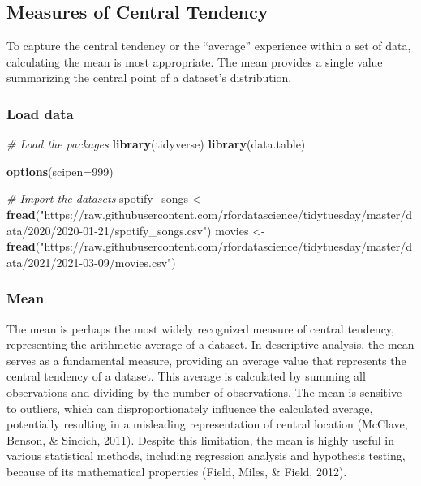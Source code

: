 \documentclass[
]{book}
\newenvironment{Shaded}{\begin{snugshade}}{\end{snugshade}}
\newcommand{\AttributeTok}[1]{\textcolor[rgb]{0.13,0.29,0.53}{#1}}
\newcommand{\CommentTok}[1]{\textcolor[rgb]{0.56,0.35,0.01}{\textit{#1}}}
\newcommand{\DecValTok}[1]{\textcolor[rgb]{0.00,0.00,0.81}{#1}}
\newcommand{\FunctionTok}[1]{\textcolor[rgb]{0.13,0.29,0.53}{\textbf{#1}}}
\newcommand{\NormalTok}[1]{#1}
\newcommand{\OtherTok}[1]{\textcolor[rgb]{0.56,0.35,0.01}{#1}}
\newcommand{\StringTok}[1]{\textcolor[rgb]{0.31,0.60,0.02}{#1}}
\begin{document}
\hypertarget{measures-of-central-tendency}{%
\subsection*{Measures of Central Tendency}\label{measures-of-central-tendency}}

To capture the central tendency or the ``average'' experience within a set of data, calculating the mean is most appropriate. The mean provides a single value summarizing the central point of a dataset's distribution.

\hypertarget{load-data}{%
\subsubsection*{Load data}\label{load-data}}

\begin{Shaded}
\begin{Highlighting}[]
\CommentTok{\# Load the packages}
\FunctionTok{library}\NormalTok{(tidyverse)}
\FunctionTok{library}\NormalTok{(data.table)}

\FunctionTok{options}\NormalTok{(}\AttributeTok{scipen=}\DecValTok{999}\NormalTok{)}

\CommentTok{\# Import the datasets}
\NormalTok{spotify\_songs }\OtherTok{\textless{}{-}} \FunctionTok{fread}\NormalTok{(}\StringTok{"https://raw.githubusercontent.com/rfordatascience/tidytuesday/master/data/2020/2020{-}01{-}21/spotify\_songs.csv"}\NormalTok{)}
\NormalTok{movies }\OtherTok{\textless{}{-}} \FunctionTok{fread}\NormalTok{(}\StringTok{"https://raw.githubusercontent.com/rfordatascience/tidytuesday/master/data/2021/2021{-}03{-}09/movies.csv"}\NormalTok{)}
\end{Highlighting}
\end{Shaded}

\hypertarget{mean}{%
\subsubsection*{Mean}\label{mean}}

The mean is perhaps the most widely recognized measure of central tendency, representing the arithmetic average of a dataset. In descriptive analysis, the mean serves as a fundamental measure, providing an average value that represents the central tendency of a dataset. This average is calculated by summing all observations and dividing by the number of observations. The mean is sensitive to outliers, which can disproportionately influence the calculated average, potentially resulting in a misleading representation of central location (McClave, Benson, \& Sincich, 2011). Despite this limitation, the mean is highly useful in various statistical methods, including regression analysis and hypothesis testing, because of its mathematical properties (Field, Miles, \& Field, 2012).
\end{document}
